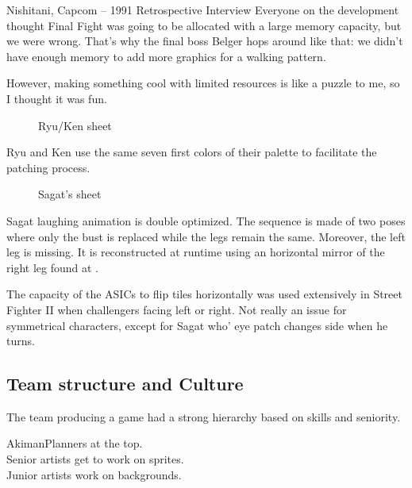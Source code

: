 \vfill
\begin{q}{Nishitani, Capcom – 1991 Retrospective Interview}
Everyone on the development thought Final Fight was going to be allocated with a large memory capacity, but we were wrong.
That's why the final boss Belger hops around like that: we didn't have enough memory to add more graphics for a walking pattern. 

However, making something cool with limited resources is like a puzzle to me, so I thought it was fun. 
\end{q}


 \begin{figure}[H]
\caption*{Ryu/Ken sheet}
\end{figure}

Ryu and Ken use the same seven first colors of their palette to facilitate the patching process. 






 \begin{figure}[H]
\caption*{Sagat's sheet}
\end{figure}

Sagat laughing animation is double optimized. The sequence is made of two poses where only the bust is replaced while the legs remain the same. Moreover, the left leg is missing. It is reconstructed at runtime using an horizontal mirror of the right leg found at .

\begin{trivia}
The capacity of the ASICs to flip tiles horizontally was used extensively in Street Fighter II when challengers facing left or right. Not really an issue for symmetrical characters, except for Sagat who' eye patch changes side when he turns.
\end{trivia}

\pagebreak

\subsection{Team structure and Culture}

The team producing a game had a strong hierarchy based on skills and seniority.

\begin{q}{Akiman\cite{akiman2003}}Planners at the top.\\
Senior artists get to work on sprites. \\
Junior artists work on backgrounds.
\end{q}

